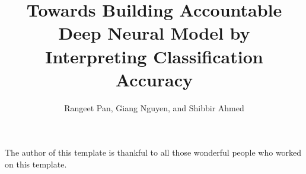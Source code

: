 \documentclass{llncs}
\begin{document}
\title{Towards Building Accountable Deep Neural Model by Interpreting Classification Accuracy}
\author{Rangeet Pan, Giang Nguyen, and Shibbir Ahmed}

%



\maketitle

\begin{abstract}

\end{abstract}

 






 
%
%

The author of this template is thankful to all those 
wonderful people who worked on this template. 


  
\end{document}
